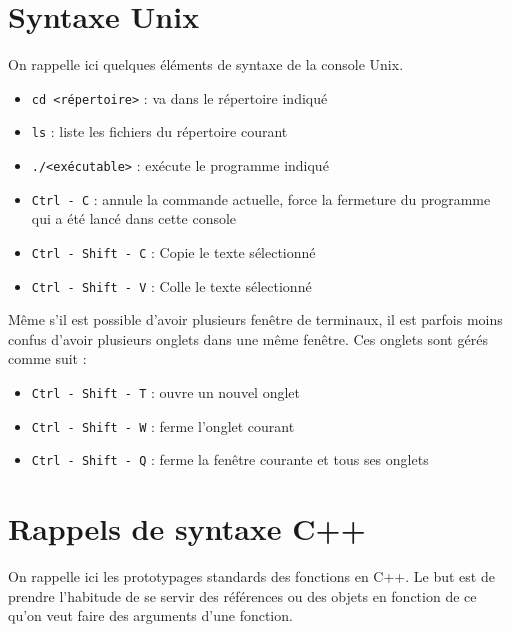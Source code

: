 \documentclass[12pt,a4paper]{article}
\begin{document}
\appendix

\newpage

\section{Syntaxe Unix}\label{anx:unix}

On rappelle ici quelques éléments de syntaxe de la console Unix.

\begin{itemize}
\item \texttt{cd <répertoire>} : va dans le répertoire indiqué
\item \texttt{ls} : liste les fichiers du répertoire courant
\item \texttt{./<exécutable>} : exécute le programme indiqué 
\item \texttt{Ctrl - C} : annule la commande actuelle, force la fermeture du programme qui a été lancé dans cette console
\item \texttt{Ctrl - Shift - C} : Copie le texte sélectionné
\item \texttt{Ctrl - Shift - V} : Colle le texte sélectionné
\end{itemize}

Même s'il est possible d'avoir plusieurs fenêtre de terminaux, il est parfois moins confus d'avoir plusieurs onglets dans une même fenêtre.
Ces onglets sont gérés comme suit :
\begin{itemize}
\item \texttt{Ctrl - Shift - T} : ouvre un nouvel onglet
\item \texttt{Ctrl - Shift - W} : ferme l'onglet courant
\item \texttt{Ctrl - Shift - Q} : ferme la fenêtre courante et tous ses onglets
\end{itemize}

\section{Rappels de syntaxe C++}
\label{anx:cpp}

On rappelle ici les prototypages standards des fonctions en C++. Le but est de prendre l'habitude de se servir des références ou des objets en fonction de ce qu'on veut faire des arguments d'une fonction.
\end{document}
